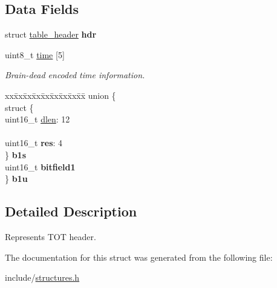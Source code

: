 \subsection*{Data Fields}
\begin{DoxyCompactItemize}
\item 
struct \hyperlink{structtable__header}{table\+\_\+header} {\bfseries hdr}\hypertarget{structtot__header_a1c3d697481719a0e48acac326a2907b8}{}\label{structtot__header_a1c3d697481719a0e48acac326a2907b8}

\item 
uint8\+\_\+t \hyperlink{structtot__header_aca49dc8fbba34272aa461fab3540209a}{time} \mbox{[}5\mbox{]}\hypertarget{structtot__header_aca49dc8fbba34272aa461fab3540209a}{}\label{structtot__header_aca49dc8fbba34272aa461fab3540209a}

\begin{DoxyCompactList}\small\item\em Brain-\/dead encoded time information. \end{DoxyCompactList}\item 
\begin{tabbing}
xx\=xx\=xx\=xx\=xx\=xx\=xx\=xx\=xx\=\kill
union \{\\
\>struct \{\\
\>\>uint16\_t \hyperlink{structtot__header_acbbfb5cc5320d11a1f02ed41ba726540}{dlen}: 12\\
\>\>\\
\>\>uint16\_t {\bfseries res}: 4\\
\>\} {\bfseries b1s}\\
\>uint16\_t {\bfseries bitfield1}\\
\} {\bfseries b1u}\hypertarget{structtot__header_ad2cc8b0ba1378f78a2f331441003da34}{}\label{structtot__header_ad2cc8b0ba1378f78a2f331441003da34}
\\

\end{tabbing}\end{DoxyCompactItemize}


\subsection{Detailed Description}
Represents T\+OT header. 

The documentation for this struct was generated from the following file\+:\begin{DoxyCompactItemize}
\item 
include/\hyperlink{structures_8h}{structures.\+h}\end{DoxyCompactItemize}
